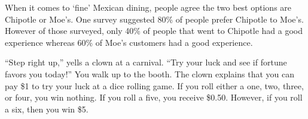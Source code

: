 \documentclass[12pt,letterpaper]{exam}
\begin{document}
\begin{questions}



\newpage
\question When it comes to `fine' Mexican dining, people agree the two best options are Chipotle or Moe's. One survey suggested 80\% of people prefer Chipotle to Moe's. However of those surveyed, only 40\% of people that went to Chipotle had a good experience whereas 60\% of Moe's customers had a good experience. \pspace




\newpage
\question ``Step right up,'' yells a clown at a carnival. ``Try your luck and see if fortune favors you today!'' You walk up to the booth. The clown explains that you can pay \$1 to try your luck at a dice rolling game. If you roll either a one, two, three, or four, you win nothing. If you roll a five, you receive \$0.50. However, if you roll a six, then you win \$5. \pspace

\end{questions}
\end{document}
